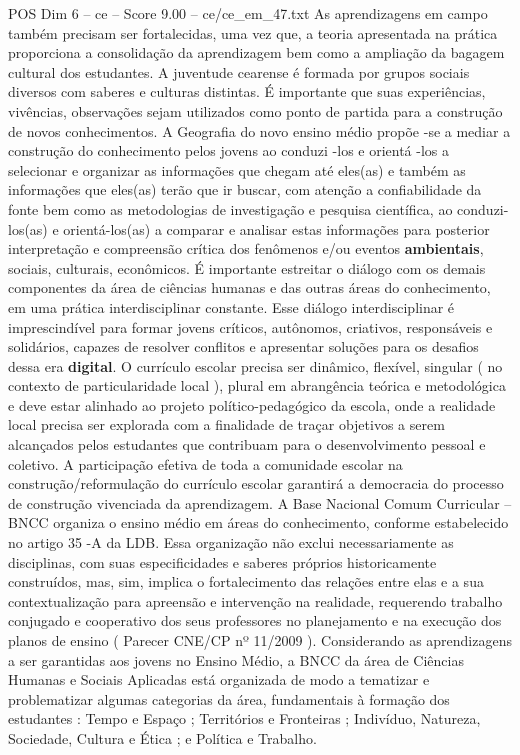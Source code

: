 \begin{textsample}{POS Dim 6 – ce – Score 9.00 – ce/ce\_em\_47.txt}
As aprendizagens em campo também precisam ser fortalecidas, uma vez que, a teoria apresentada na prática proporciona a consolidação da aprendizagem bem como a ampliação da bagagem cultural dos estudantes.
A juventude cearense é formada por grupos sociais diversos com saberes e culturas distintas.
É importante que suas experiências, vivências, observações sejam utilizados como ponto de partida para a construção de novos conhecimentos.
A Geografia do novo ensino médio propõe -se a mediar a construção do conhecimento pelos jovens ao conduzi -los e orientá -los a selecionar e organizar as informações que chegam até eles(as) e também as informações que eles(as) terão que ir buscar, com atenção a confiabilidade da fonte bem como as metodologias de investigação e pesquisa científica, ao conduzi-los(as) e orientá-los(as) a comparar e analisar estas informações para posterior interpretação e compreensão crítica dos fenômenos e/ou eventos \textbf{ambientais}, sociais, culturais, econômicos.
É importante estreitar o diálogo com os demais componentes da área de ciências humanas e das outras áreas do conhecimento, em uma prática interdisciplinar constante.
Esse diálogo interdisciplinar é imprescindível para formar jovens críticos, autônomos, criativos, responsáveis e solidários, capazes de resolver conflitos e apresentar soluções para os desafios dessa era \textbf{digital}.
O currículo escolar precisa ser dinâmico, flexível, singular ( no contexto de particularidade local ), plural em abrangência teórica e metodológica e deve estar alinhado ao projeto político-pedagógico da escola, onde a realidade local precisa ser explorada com a finalidade de traçar objetivos a serem alcançados pelos estudantes que contribuam para o desenvolvimento pessoal e coletivo.
A participação efetiva de toda a comunidade escolar na construção/reformulação do currículo escolar garantirá a democracia do processo de construção vivenciada da aprendizagem.
A Base Nacional Comum Curricular – BNCC organiza o ensino médio em áreas do conhecimento, conforme estabelecido no artigo 35 -A da LDB.
Essa organização não exclui necessariamente as disciplinas, com suas especificidades e saberes próprios historicamente construídos, mas, sim, implica o fortalecimento das relações entre elas e a sua contextualização para apreensão e intervenção na realidade, requerendo trabalho conjugado e cooperativo dos seus professores no planejamento e na execução dos planos de ensino ( Parecer CNE/CP nº 11/2009 ).
Considerando as aprendizagens a ser garantidas aos jovens no Ensino Médio, a BNCC da área de Ciências Humanas e Sociais Aplicadas está organizada de modo a tematizar e problematizar algumas categorias da área, fundamentais à formação dos estudantes : Tempo e Espaço ; Territórios e Fronteiras ; Indivíduo, Natureza, Sociedade, Cultura e Ética ; e Política e Trabalho.

\end{textsample}
